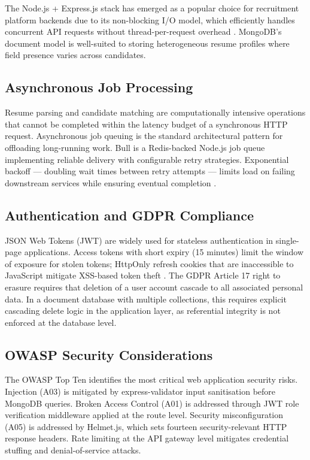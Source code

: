 The Node.js + Express.js stack has emerged as a popular choice for recruitment platform backends due to its non-blocking I/O model, which efficiently handles concurrent API requests without thread-per-request overhead \citep{Tilkov2010}. MongoDB's document model is well-suited to storing heterogeneous resume profiles where field presence varies across candidates.

\subsection{Asynchronous Job Processing}

Resume parsing and candidate matching are computationally intensive operations that cannot be completed within the latency budget of a synchronous HTTP request. Asynchronous job queuing is the standard architectural pattern for offloading long-running work. Bull \citep{BullDocs2023} is a Redis-backed Node.js job queue implementing reliable delivery with configurable retry strategies. Exponential backoff --- doubling wait times between retry attempts --- limits load on failing downstream services while ensuring eventual completion \citep{Amazon2022}.

\subsection{Authentication and GDPR Compliance}

JSON Web Tokens (JWT) \citep{RFC7519} are widely used for stateless authentication in single-page applications. Access tokens with short expiry (15 minutes) limit the window of exposure for stolen tokens; HttpOnly refresh cookies that are inaccessible to JavaScript mitigate XSS-based token theft \citep{OWASP2021}. The GDPR Article 17 right to erasure \citep{GDPR2016} requires that deletion of a user account cascade to all associated personal data. In a document database with multiple collections, this requires explicit cascading delete logic in the application layer, as referential integrity is not enforced at the database level.

\subsection{OWASP Security Considerations}

The OWASP Top Ten \citep{OWASP2021} identifies the most critical web application security risks. Injection (A03) is mitigated by express-validator input sanitisation before MongoDB queries. Broken Access Control (A01) is addressed through JWT role verification middleware applied at the route level. Security misconfiguration (A05) is addressed by Helmet.js, which sets fourteen security-relevant HTTP response headers. Rate limiting at the API gateway level mitigates credential stuffing and denial-of-service attacks.

